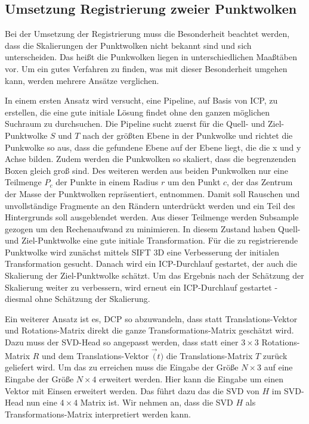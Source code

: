 \documentclass[12pt,titlepage, twoside]{article}
\begin{document}
\subsection{Umsetzung Registrierung zweier Punktwolken}
\label{sec:realisierung:implementierung2}

Bei der Umsetzung der Registrierung muss die Besonderheit beachtet werden, dass die Skalierungen der Punktwolken nicht bekannt sind und sich unterscheiden. 
Das heißt die Punkwolken liegen in unterschiedlichen Maaßtäben vor.  
Um ein gutes Verfahren zu finden, was mit dieser Besonderheit umgehen kann, werden mehrere Ansätze verglichen.

In einem ersten Ansatz wird versucht, eine Pipeline, auf Basis von ICP, zu erstellen, die eine gute initiale Lösung findet ohne den ganzen möglichen Suchraum zu durchsuchen.
Die Pipeline sucht zuerst für die Quell- und Ziel-Punktwolke $S$ und $T$ nach der größten Ebene in der Punkwolke und richtet die Punkwolke so aus, dass die gefundene Ebene auf der Ebene liegt, die die x und y Achse bilden.
Zudem werden die Punkwolken so skaliert, dass die begrenzenden Boxen gleich groß sind.
Des weiteren werden aus beiden Punkwolken nur eine Teilmenge $P_c$ der Punkte in einem Radius $r$ um den Punkt $c$, der das Zentrum der Masse der Punktwolken repräsentiert, entnommen.
Damit soll Rauschen und unvollständige Fragmente an den Rändern unterdrückt werden und ein Teil des Hintergrunds soll ausgeblendet werden.
Aus dieser Teilmenge werden Subsample gezogen um den Rechenaufwand zu minimieren. In diesem Zustand haben Quell- und Ziel-Punktwolke eine gute initiale Transformation.
Für die zu registrierende Punktwolke wird zunächst mittels SIFT 3D \cite{Sift3D} eine Verbesserung der initialen Transformation gesucht. 
Danach wird ein ICP-Durchlauf gestartet, der auch die Skalierung der Ziel-Punktwolke schätzt.
Um das Ergebnis nach der Schätzung der Skalierung weiter zu verbessern, wird erneut ein ICP-Durchlauf gestartet - diesmal ohne Schätzung der Skalierung.

Ein weiterer Ansatz ist es, DCP so abzuwandeln, dass statt Translations-Vektor und Rotations-Matrix direkt die ganze Transformations-Matrix geschätzt wird. 
Dazu muss der SVD-Head so angepasst werden, dass statt einer $3\times 3$ Rotations-Matrix $R$ und dem Translations-Vektor $\vec(t)$ die Translations-Matrix $T$ zurück geliefert wird.
Um das zu erreichen muss die Eingabe der Größe $N\times 3$ auf eine Eingabe der Größe $N\times 4$ erweitert werden. Hier kann die Eingabe um einen Vektor mit Einsen erweitert werden.
Das führt dazu das die SVD von $H$ im SVD-Head nun eine $4\times 4$ Matrix ist. Wir nehmen an, dass die SVD $H$ als Transformations-Matrix interpretiert werden kann.
\end{document}
